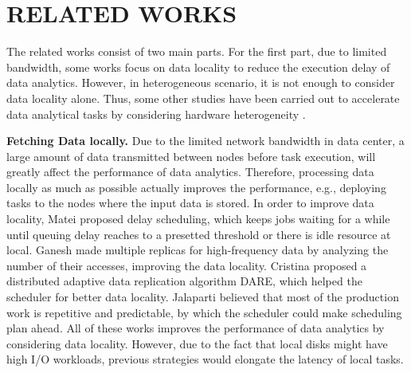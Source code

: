 \documentclass[conference]{IEEEtran}
\begin{document}
\section{RELATED WORKS}\label{RELATED_WORKS}
The related works consist of two main parts. For the first part, due to limited bandwidth, some works focus on data locality to reduce the execution delay of data analytics. However, in heterogeneous scenario, it is not enough to consider data locality alone. Thus, some other studies have been carried out to accelerate data analytical tasks by considering hardware heterogeneity \cite{b1} \cite{b6} \cite{b19} \cite{b8}.

\textbf{Fetching Data locally.} Due to the limited network bandwidth in data center, a large amount of data transmitted between nodes before task execution, will greatly affect the performance of data analytics. Therefore, processing data locally as much as possible actually improves the performance, e.g., deploying tasks to the nodes where the input data is stored. 
In order to improve data locality, Matei \cite{b2} proposed delay scheduling, which keeps jobs waiting for a while until queuing delay reaches to a presetted threshold or there is idle resource at local.
Ganesh \cite{b3} made multiple replicas for high-frequency data by analyzing the number of their accesses, improving the data locality. 
Cristina \cite{b4} proposed a distributed adaptive data replication algorithm DARE, which helped the scheduler for better data locality. 
Jalaparti \cite{b5} believed that most of the production work is repetitive and predictable, by which the scheduler could make scheduling plan ahead. 
All of these works improves the performance of data analytics by considering data locality. 
However, due to the fact that local disks might have high I/O workloads, previous strategies would elongate the latency of local tasks.
\end{document}

